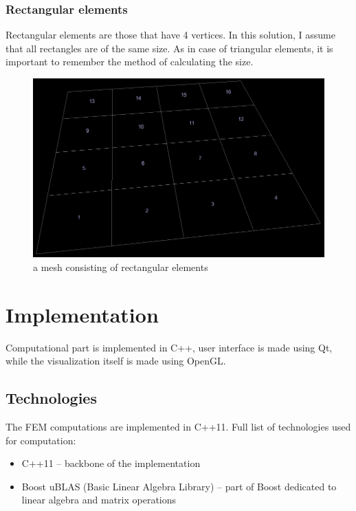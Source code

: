 \documentclass[a4paper,12pt]{article}
\begin{document}

\subsubsection{Rectangular elements}

Rectangular elements are those that have 4 vertices. In this solution, I assume that all rectangles are of the
same size. As in case of triangular elements, it is important to remember the method of calculating the size.

\begin{figure}[H]
\begin{center}
  \includegraphics[width=\textwidth]{mesh_rectangular}
\end{center}
\caption{a mesh consisting of rectangular elements}
\end{figure}


\section{Implementation}

Computational part is implemented in C++, user interface is made using Qt, while the visualization itself is made using
OpenGL.

\subsection{Technologies}

The FEM computations are implemented in C++11. Full list of technologies used for computation:

\begin{itemize}
  \item C++11 -- backbone of the implementation
  \item Boost uBLAS (Basic Linear Algebra Library) -- part of Boost dedicated to linear algebra and matrix operations
\end{itemize}
\end{document}
